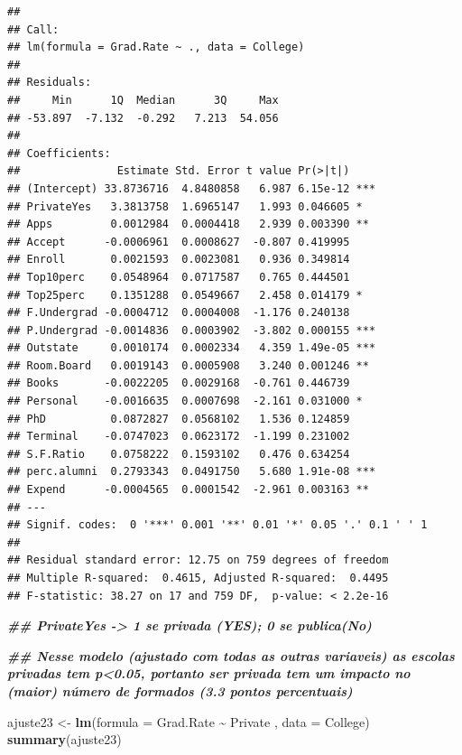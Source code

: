 \documentclass[
]{article}
\newenvironment{Shaded}{\begin{snugshade}}{\end{snugshade}}
\newcommand{\AttributeTok}[1]{\textcolor[rgb]{0.13,0.29,0.53}{#1}}
\newcommand{\DocumentationTok}[1]{\textcolor[rgb]{0.56,0.35,0.01}{\textbf{\textit{#1}}}}
\newcommand{\FunctionTok}[1]{\textcolor[rgb]{0.13,0.29,0.53}{\textbf{#1}}}
\newcommand{\NormalTok}[1]{#1}
\newcommand{\OtherTok}[1]{\textcolor[rgb]{0.56,0.35,0.01}{#1}}
\newcommand{\SpecialCharTok}[1]{\textcolor[rgb]{0.81,0.36,0.00}{\textbf{#1}}}
\begin{document}
\begin{verbatim}
## 
## Call:
## lm(formula = Grad.Rate ~ ., data = College)
## 
## Residuals:
##     Min      1Q  Median      3Q     Max 
## -53.897  -7.132  -0.292   7.213  54.056 
## 
## Coefficients:
##               Estimate Std. Error t value Pr(>|t|)    
## (Intercept) 33.8736716  4.8480858   6.987 6.15e-12 ***
## PrivateYes   3.3813758  1.6965147   1.993 0.046605 *  
## Apps         0.0012984  0.0004418   2.939 0.003390 ** 
## Accept      -0.0006961  0.0008627  -0.807 0.419995    
## Enroll       0.0021593  0.0023081   0.936 0.349814    
## Top10perc    0.0548964  0.0717587   0.765 0.444501    
## Top25perc    0.1351288  0.0549667   2.458 0.014179 *  
## F.Undergrad -0.0004712  0.0004008  -1.176 0.240138    
## P.Undergrad -0.0014836  0.0003902  -3.802 0.000155 ***
## Outstate     0.0010174  0.0002334   4.359 1.49e-05 ***
## Room.Board   0.0019143  0.0005908   3.240 0.001246 ** 
## Books       -0.0022205  0.0029168  -0.761 0.446739    
## Personal    -0.0016635  0.0007698  -2.161 0.031000 *  
## PhD          0.0872827  0.0568102   1.536 0.124859    
## Terminal    -0.0747023  0.0623172  -1.199 0.231002    
## S.F.Ratio    0.0758222  0.1593102   0.476 0.634254    
## perc.alumni  0.2793343  0.0491750   5.680 1.91e-08 ***
## Expend      -0.0004565  0.0001542  -2.961 0.003163 ** 
## ---
## Signif. codes:  0 '***' 0.001 '**' 0.01 '*' 0.05 '.' 0.1 ' ' 1
## 
## Residual standard error: 12.75 on 759 degrees of freedom
## Multiple R-squared:  0.4615, Adjusted R-squared:  0.4495 
## F-statistic: 38.27 on 17 and 759 DF,  p-value: < 2.2e-16
\end{verbatim}

\begin{Shaded}
\begin{Highlighting}[]
\DocumentationTok{\#\# PrivateYes {-}\textgreater{} 1 se privada (YES); 0 se publica(No)}

\DocumentationTok{\#\# Nesse modelo (ajustado com todas as outras variaveis) as escolas privadas tem p\textless{}0.05, portanto ser privada tem um impacto  no (maior) número de formados (3.3 pontos percentuais)}

\NormalTok{ajuste23 }\OtherTok{\textless{}{-}} \FunctionTok{lm}\NormalTok{(}\AttributeTok{formula =}\NormalTok{ Grad.Rate }\SpecialCharTok{\textasciitilde{}}\NormalTok{ Private , }\AttributeTok{data =}\NormalTok{ College)}
\FunctionTok{summary}\NormalTok{(ajuste23)}
\end{Highlighting}
\end{Shaded}
\end{document}
